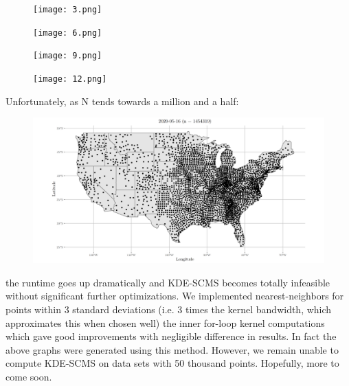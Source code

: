 \documentclass[letterpaper,reqno, 11pt]{amsart}
\theoremstyle{plain}
\theoremstyle{definition}
\newcommand{\1}{\mathds{1}}
\begin{document}
\begin{figure}[hbt]
\texttt{[image: 3.png]}
\end{figure}

\newpage

\begin{figure}[hbt]
\texttt{[image: 6.png]}
\end{figure}

\newpage

\begin{figure}[hbt]
\texttt{[image: 9.png]}
\end{figure}

\newpage

\begin{figure}[hbt]
\texttt{[image: 12.png]}
\end{figure}

\newpage

Unfortunately, as N tends towards a million and a half:
\begin{figure}[hbt]
\includegraphics[width=\textwidth]{millions.png}
\end{figure}

the runtime goes up dramatically and KDE-SCMS becomes totally infeasible without significant further optimizations. We implemented nearest-neighbors for points within 3 standard deviations (i.e. 3 times the kernel bandwidth, which approximates this when chosen well) the inner for-loop kernel computations which gave good improvements with negligible difference in results. In fact the above graphs were generated using this method. However, we remain unable to compute KDE-SCMS on data sets with 50 thousand points. Hopefully, more to come soon.

\newpage
\nocite{*}
\printbibliography
\end{document}
